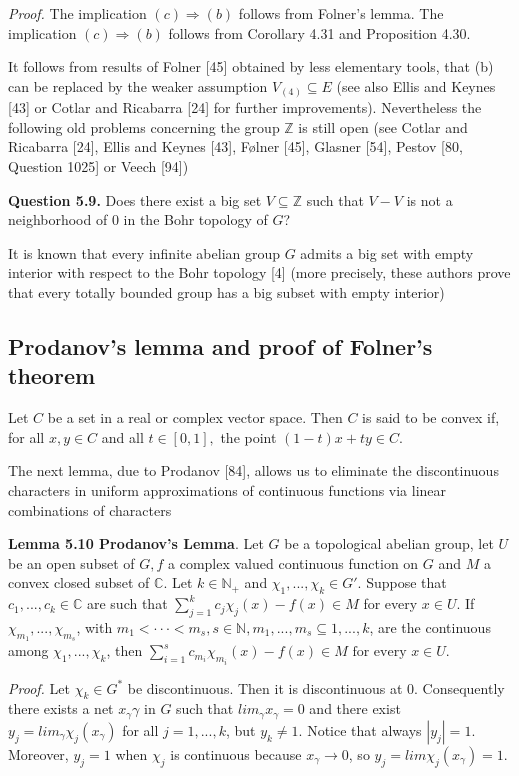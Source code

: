 \documentclass[12pt]{article}
\begin{document}
\emph{Proof.}  The implication $(c) \Rightarrow (b)$ follows from Folner's lemma. The implication $(c) \Rightarrow (b)$ follows from Corollary
4.31 and Proposition 4.30.


    It follows from results of Folner [45] obtained by less elementary tools, that (b) can be replaced by the weaker
assumption $V_{(4)} \subseteq E$ (see also Ellis and Keynes [43] or Cotlar and Ricabarra [24] for further improvements).
Nevertheless the following old problems concerning the group $\mathbb{Z}$ is still open (see Cotlar and Ricabarra [24],
Ellis and Keynes [43], Følner [45], Glasner [54], Pestov [80, Question 1025] or Veech [94])


\textbf{Question 5.9.}  Does there exist a big set $V \subseteq \mathbb{Z}$ such that $V - V$ is not a neighborhood of 0 in the Bohr
topology of $G$?


    It is known that every infinite abelian group $G$ admits a big set with empty interior with respect to the Bohr
topology [4] (more precisely, these authors prove that every totally bounded group has a big subset with empty
interior)


\subsection{Prodanov's lemma and proof of Folner's theorem}


Let $C$ be a set in a real or complex vector space. Then $C$ is said to be convex if, for all $x, y \in C$ and all $t \in [0, 1],$
the point $(1 - t)x + ty \in C$.


    The next lemma, due to Prodanov [84], allows us to eliminate the discontinuous characters in uniform
approximations of continuous functions via linear combinations of characters


\textbf{Lemma 5.10 Prodanov's Lemma}. Let $G$ be a topological abelian group, let $U$ be an open subset of $G, f$ a
complex valued continuous function on $G$ and $M$ a convex closed subset of $\mathbb{C}$. Let $k \in \mathbb{N}_+$ and $\chi_1, . . . , \chi_k \in G'$.
Suppose that $c_1, . . . , c_k \in \mathbb{C}$ are such that $\sum^k_{j=1} c_j \chi_j (x) - f(x) \in M$ for every $x \in U$. If $\chi_{m_1}, . . . , \chi_{m_s}$, with
$m_1 < · · · < m_s, s \in \mathbb{N}, {m_1, . . . , m_s} \subseteq {1, . . . , k}$, are the continuous among $\chi_1, . . . , \chi_k$, then
$\sum^s_{i=1} c_{m_i} \chi_{m_i}(x)-f(x) \in M \text{ for every } x \in U.$


\emph{Proof.} Let $\chi_k \in G^*$ be discontinuous. Then it is discontinuous at 0. Consequently there exists a net ${x_\gamma}\gamma$ in
$G$ such that $lim_\gamma x_\gamma = 0$ and there exist $y_j = lim_\gamma \chi_j (x_\gamma)$ for all $j = 1, . . . , k$, but $y_k \neq 1$. Notice that always
$|y_j | = 1$. Moreover, $y_j = 1$ when $\chi_j$ is continuous because $x_\gamma \to 0$, so $y_j = lim \chi_j (x_\gamma) = 1$.
\end{document}

